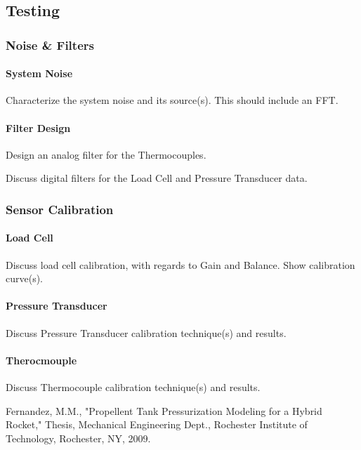 \documentclass[10pt,a4paper]{article}
\begin{document}
\newpage
\subsection{Testing}

\subsubsection{Noise \& Filters}

\paragraph{System Noise}

Characterize the system noise and its source(s). This should include an FFT.

\paragraph{Filter Design}

Design an analog filter for the Thermocouples. 

Discuss digital filters for the Load Cell and Pressure Transducer data. 

\subsubsection{Sensor Calibration}

\paragraph{Load Cell}

Discuss load cell calibration, with regards to Gain and Balance. Show calibration curve(s). 

\paragraph{Pressure Transducer}

Discuss Pressure Transducer calibration technique(s) and results.

\paragraph{Therocmouple}

Discuss Thermocouple calibration technique(s) and results.

\begin{thebibliography}{10}
	
	Fernandez, M.M., 
	"Propellent Tank Pressurization Modeling for a Hybrid Rocket,"
	Thesis, Mechanical Engineering Dept., Rochester Institute of      
	Technology, 
	Rochester, NY, 2009.
	
\end{thebibliography}
\end{document}
